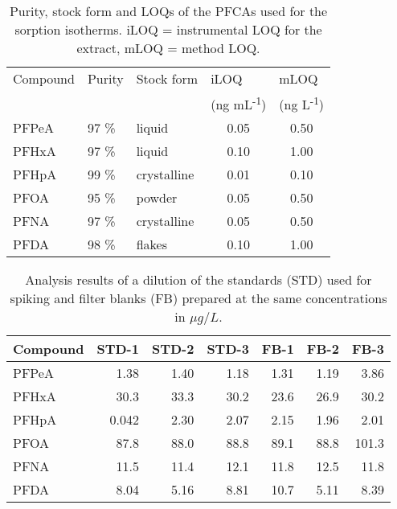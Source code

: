 \begin{table}[hb]
    \centering
    \caption{Purity, stock form and LOQs of the PFCAs used for the sorption isotherms. iLOQ = instrumental LOQ for  the extract, mLOQ = method LOQ.}
    \label{apptab:LOQ}
    \begin{tabular}{@{}lllcc@{}}
    \toprule
    \multicolumn{1}{l}{Compound}  & \multicolumn{1}{l}{Purity}  & \multicolumn{1}{l}{Stock form} & \multicolumn{1}{l}{iLOQ} & \multicolumn{1}{l}{mLOQ}  \\ 
    & & & \multicolumn{1}{l}{(ng mL\textsuperscript{-1})}  & \multicolumn{1}{l}{(ng L\textsuperscript{-1})} \\ \midrule
     PFPeA  & 97 \%   & liquid      & 0.05 & 0.50   \\
     PFHxA  & 97 \%   & liquid      & 0.10 & 1.00   \\
     PFHpA  & 99 \%   & crystalline & 0.01 & 0.10   \\
     PFOA   & 95 \%   & powder      & 0.05 & 0.50   \\
     PFNA   & 97 \%   & crystalline & 0.05 & 0.50   \\
     PFDA   & 98 \%   & flakes      & 0.10 & 1.00   \\ \bottomrule
    \end{tabular}
\end{table}


\begin{table}
\centering
\caption{Analysis results of a dilution of the standards (STD) used for spiking and filter blanks (FB) prepared at the same concentrations in $\mu g/L$.}
\label{apptab:FB}
\begin{tabular}{lrrrrrr} \toprule
Compound & \multicolumn{1}{c}{STD-1} & \multicolumn{1}{c}{STD-2} & \multicolumn{1}{c}{STD-3} & \multicolumn{1}{c}{FB-1} & \multicolumn{1}{c}{FB-2} & \multicolumn{1}{c}{FB-3} \\ \midrule
PFPeA & 1.38 & 1.40 & 1.18 & 1.31 & 1.19 & 3.86 \\
PFHxA & 30.3 & 33.3 & 30.2 & 23.6 & 26.9 & 30.2 \\
PFHpA & 0.042 & 2.30 & 2.07 & 2.15 & 1.96 & 2.01 \\
PFOA & 87.8 & 88.0 & 88.8 & 89.1 & 88.8 & 101.3 \\
PFNA & 11.5 & 11.4 & 12.1 & 11.8 & 12.5 & 11.8 \\
PFDA & 8.04 & 5.16 & 8.81 & 10.7 & 5.11 & 8.39 \\ \bottomrule
\end{tabular}
\end{table}


